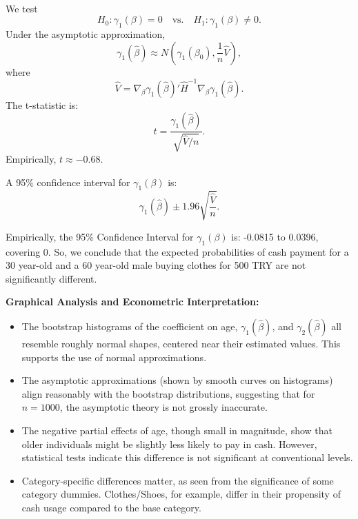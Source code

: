 \documentclass[a4paper,12pt]{article} %
\theoremstyle{nonitalic}
\newenvironment{solution}[1]
  {\renewcommand\theinnercustomsol{#1}\innercustomsol}
  {\endinnercustomsol}
\newcounter{solutionctr}[section]
\renewcommand{\thesolutionctr}{(\alph{solutionctr})}
\newenvironment{autosolution}
  {\stepcounter{solutionctr}\begin{solution}{\thesolutionctr}}
  {\end{solution}}
\begin{document}
\begin{autosolution}
    \

    We test
    \[
    H_0: \gamma_1(\beta)=0 \quad \text{vs.} \quad H_1: \gamma_1(\beta)\neq 0.
    \]
    Under the asymptotic approximation,
    \[
    \gamma_1(\hat{\beta}) \approx N\left(\gamma_1(\beta_0), \frac{1}{n}\hat{V}\right),
    \]
    where
    \[
    \hat{V} = \nabla_\beta \gamma_1(\hat{\beta})' \hat{H}^{-1} \nabla_\beta \gamma_1(\hat{\beta}).
    \]
    The t-statistic is:
    \[
    t = \frac{\gamma_1(\hat{\beta})}{\sqrt{\hat{V}/n}}.
    \]
    Empirically, $t \approx -0.68$.
    
    A 95\% confidence interval for $\gamma_1(\beta)$ is:
    \[
    \gamma_1(\hat{\beta}) \pm 1.96 \sqrt{\frac{\hat{V}}{n}}.
    \]

    Empirically, the 95\% Confidence Interval for $\gamma_1(\beta)$ is: -0.0815 to 0.0396,
    covering 0. So, we conclude that the expected probabilities of cash payment for a 30 year-old
    and a 60 year-old male buying clothes for 500 TRY are not significantly different.
    
    \textbf{Graphical Analysis and Econometric Interpretation:}
    \begin{itemize}
        \item The bootstrap histograms of the coefficient on age, $\gamma_1(\hat{\beta})$, and $\gamma_2(\hat{\beta})$ all resemble roughly normal shapes, centered near their estimated values. This supports the use of normal approximations.
        \item The asymptotic approximations (shown by smooth curves on histograms) align reasonably with the bootstrap distributions, suggesting that for $n=1000$, the asymptotic theory is not grossly inaccurate.
        \item The negative partial effects of age, though small in magnitude, show that older individuals might be slightly less likely to pay in cash. However, statistical tests indicate this difference is not significant at conventional levels.
        \item Category-specific differences matter, as seen from the significance of some category dummies. Clothes/Shoes, for example, differ in their propensity of cash usage compared to the base category.
    \end{itemize}
\end{autosolution}
\end{document}
